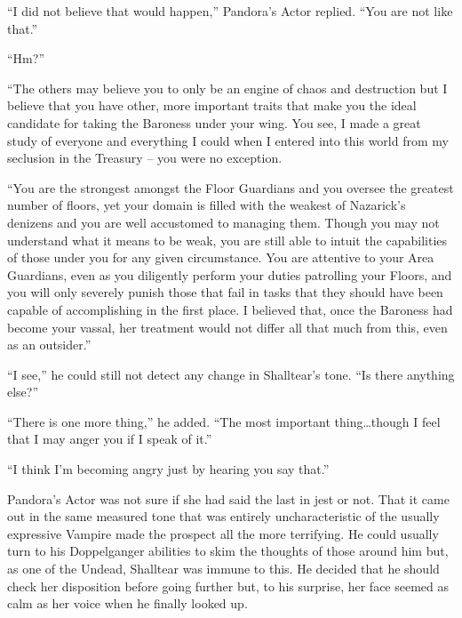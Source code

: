  

“I did not believe that would happen,” Pandora’s Actor replied. “You are not like that.”

 

“Hm?”

 

“The others may believe you to only be an engine of chaos and destruction but I believe that you have other, more important traits that make you the ideal candidate for taking the Baroness under your wing. You see, I made a great study of everyone and everything I could when I entered into this world from my seclusion in the Treasury – you were no exception.

 

“You are the strongest amongst the Floor Guardians and you oversee the greatest number of floors, yet your domain is filled with the weakest of Nazarick’s denizens and you are well accustomed to managing them. Though you may not understand what it means to be weak, you are still able to intuit the capabilities of those under you for any given circumstance. You are attentive to your Area Guardians, even as you diligently perform your duties patrolling your Floors, and you will only severely punish those that fail in tasks that they should have been capable of accomplishing in the first place. I believed that, once the Baroness had become your vassal, her treatment would not differ all that much from this, even as an outsider.”

 

“I see,” he could still not detect any change in Shalltear’s tone. “Is there anything else?”

 

“There is one more thing,” he added. “The most important thing…though I feel that I may anger you if I speak of it.”

 

“I think I’m becoming angry just by hearing you say that.”

 

Pandora’s Actor was not sure if she had said the last in jest or not. That it came out in the same measured tone that was entirely uncharacteristic of the usually expressive Vampire made the prospect all the more terrifying. He could usually turn to his Doppelganger abilities to skim the thoughts of those around him but, as one of the Undead, Shalltear was immune to this. He decided that he should check her disposition before going further but, to his surprise, her face seemed as calm as her voice when he finally looked up.

